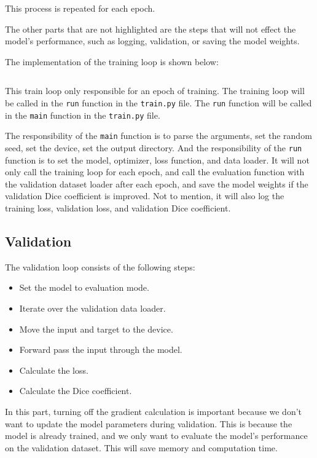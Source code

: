 This process is repeated for each epoch.

The other parts that are not highlighted are the steps that will not effect the model's performance, such as logging, validation, or saving the model weights.

The implementation of the training loop is shown below:

\inputminted[firstline=23, lastline=56, highlightlines={38,29,41,42,48-51}]{python}{../src/train.py}

This train loop only responsible for an epoch of training.
The training loop will be called in the \texttt{run} function in the \texttt{train.py} file.
The \texttt{run} function will be called in the \texttt{main} function in the \texttt{train.py} file.

The responsibility of the \texttt{main} function is to parse the arguments, set the random seed, set the device, set the output directory.
And the responsibility of the \texttt{run} function is to set the model, optimizer, loss function, and data loader.
It will not only call the training loop for each epoch, and call the evaluation function with the validation dataset loader after each epoch, and save the model weights if the validation Dice coefficient is improved.
Not to mention, it will also log the training loss, validation loss, and validation Dice coefficient.


\subsection{Validation}

The validation loop consists of the following steps:
\begin{itemize}
    \item Set the model to evaluation mode.
    \item Iterate over the validation data loader.
    \item Move the input and target to the device.
    \item Forward pass the input through the model.
    \item Calculate the loss.
    \item Calculate the Dice coefficient.
\end{itemize}

In this part, turning off the gradient calculation is important because we don't want to update the model parameters during validation.
This is because the model is already trained, and we only want to evaluate the model's performance on the validation dataset.
This will save memory and computation time.

